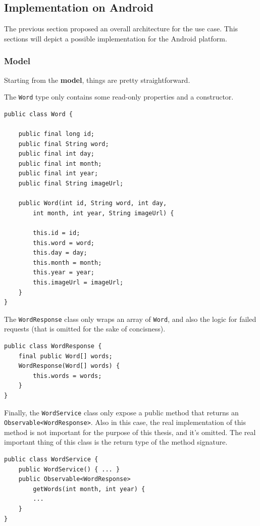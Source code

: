 \subsection{Implementation on Android}\label{implementation-on-android}

The previous section proposed an overall architecture for the use case.
This sections will depict a possible implementation for the Android
platform.

\subsubsection{Model}\label{model}

Starting from the \textbf{model}, things are pretty straightforward.

The \texttt{Word} type only contains some read-only properties and a
constructor.

\begin{verbatim}
public class Word {

    public final long id;
    public final String word;
    public final int day;
    public final int month;
    public final int year;
    public final String imageUrl;

    public Word(int id, String word, int day,
        int month, int year, String imageUrl) {

        this.id = id;
        this.word = word;
        this.day = day;
        this.month = month;
        this.year = year;
        this.imageUrl = imageUrl;
    }
}
\end{verbatim}

The \texttt{WordResponse} class only wraps an array of \texttt{Word},
and also the logic for failed requests (that is omitted for the sake of
concisness).

\begin{verbatim}
public class WordResponse {
    final public Word[] words;
    WordResponse(Word[] words) {
        this.words = words;
    }
}
\end{verbatim}

Finally, the \texttt{WordService} class only expose a public method that
returns an \texttt{Observable\textless{}WordResponse\textgreater{}}.
Also in this case, the real implementation of this method is not
important for the purpose of this thesis, and it's omitted. The real
important thing of this class is the return type of the method
signature.

\begin{verbatim}
public class WordService {
    public WordService() { ... }
    public Observable<WordResponse>
        getWords(int month, int year) {
        ...
    }
}
\end{verbatim}

